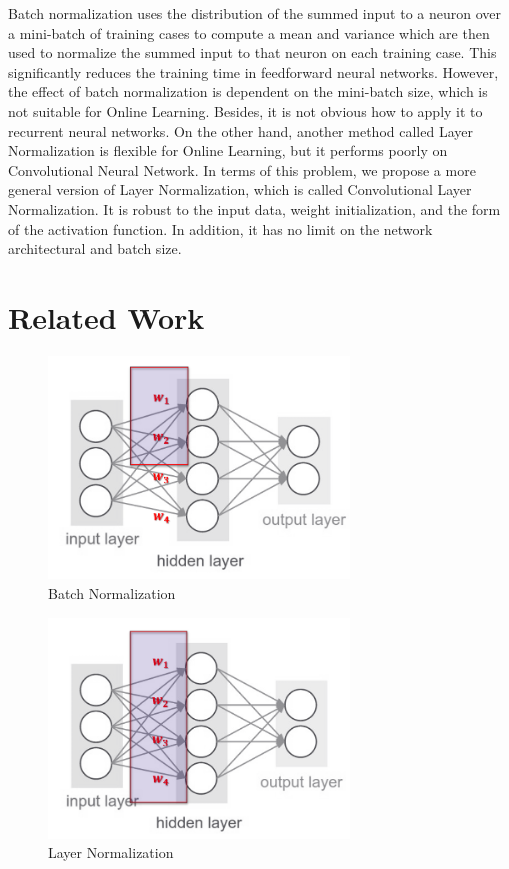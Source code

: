 \documentclass{sig-alternate}
\begin{document}
    Batch normalization uses the distribution of the summed input to a neuron over a mini-batch of training cases to compute a mean and variance which are then used to normalize the summed input to that neuron on each training case. This significantly reduces the training time in feedforward neural networks. However, the effect of batch normalization is dependent on the mini-batch size, which is not suitable for Online Learning. Besides, it is not obvious how to apply it to recurrent neural networks. On the other hand, another method called Layer Normalization is flexible for Online Learning, but it performs poorly on Convolutional Neural Network. In terms of this problem, we propose a more general version of Layer Normalization, which is called Convolutional Layer Normalization. It is robust to the input data, weight initialization, and the form of the activation function. In addition, it has no limit on the network architectural and batch size.


\section{Related Work}

    \begin{figure}[t!]
        \centering
        \centerline{\includegraphics[width=8cm]{batch_norm}}
        \caption{Batch Normalization}
        \label{fig:batch_norm}
    \end{figure}
    \begin{figure}[t!]
        \centering
        \centerline{\includegraphics[width=8cm]{layer_norm}}
        \caption{Layer Normalization}
        \label{fig:layer_norm}
    \end{figure}
    
\end{document}
